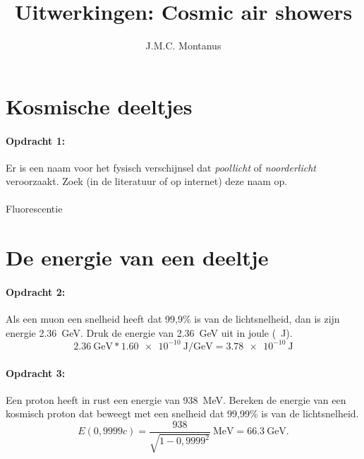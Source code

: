 

\title{Uitwerkingen: Cosmic air showers}
\author{J.M.C. Montanus}



\maketitle

\section{Kosmische deeltjes}

\begin{minipage}[t]{1\columnwidth}
\paragraph{Opdracht 1:}
Er is een naam voor het fysisch verschijnsel dat \emph{poollicht} of
\emph{noorderlicht} veroorzaakt. Zoek (in de literatuur of op internet)
deze naam op.
\\ \\
Fluorescentie
\end{minipage}


\section{De energie van een deeltje}

\begin{minipage}[t]{1\columnwidth}
\paragraph{Opdracht 2:}
Als een muon een snelheid heeft dat 99,9\% is van de lichtsnelheid, dan
is zijn energie \SI{2,36}{\giga\electronvolt}. Druk de energie van
\SI{2,36}{\giga\electronvolt} uit in joule (\SI{}{\joule}).
\begin{equation}
    \SI{2,36}{\giga\electronvolt} *
    \SI{1.60e-10}{\joule\per\giga\electronvolt} = \SI{3,78e-10}{\joule}
    \nonumber
\end{equation}
\end{minipage}
\smallskip{}

\begin{minipage}[t]{1\columnwidth}
\paragraph{Opdracht 3:}
Een proton heeft in rust een energie van \SI{938}{\mega\electronvolt}.
Bereken de energie van een kosmisch proton dat beweegt met een snelheid
dat 99,99\% is van de lichtsnelheid.
\begin{equation} 
    E(0,9999c) = \frac{938}{\sqrt{1-0,9999^2}}\SI{}{\mega\electronvolt}
    = \SI{66,3}{\giga\electronvolt}. \nonumber
\end{equation}
\end{minipage}
\bigskip{}

